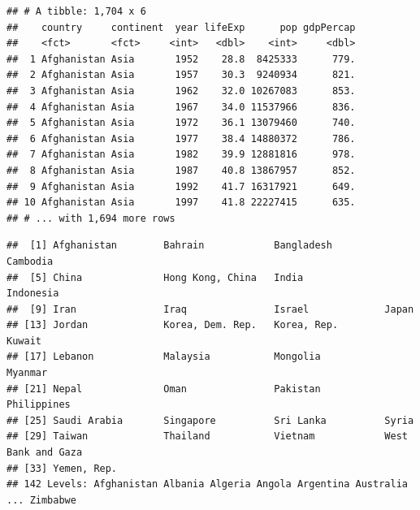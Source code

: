 \documentclass[
]{article}
\newenvironment{Shaded}{\begin{snugshade}}{\end{snugshade}}
\newcommand{\FunctionTok}[1]{\textcolor[rgb]{0.00,0.00,0.00}{#1}}
\newcommand{\NormalTok}[1]{#1}
\newcommand{\SpecialCharTok}[1]{\textcolor[rgb]{0.00,0.00,0.00}{#1}}
\newcommand{\StringTok}[1]{\textcolor[rgb]{0.31,0.60,0.02}{#1}}
\begin{document}
\begin{verbatim}
## # A tibble: 1,704 x 6
##    country     continent  year lifeExp      pop gdpPercap
##    <fct>       <fct>     <int>   <dbl>    <int>     <dbl>
##  1 Afghanistan Asia       1952    28.8  8425333      779.
##  2 Afghanistan Asia       1957    30.3  9240934      821.
##  3 Afghanistan Asia       1962    32.0 10267083      853.
##  4 Afghanistan Asia       1967    34.0 11537966      836.
##  5 Afghanistan Asia       1972    36.1 13079460      740.
##  6 Afghanistan Asia       1977    38.4 14880372      786.
##  7 Afghanistan Asia       1982    39.9 12881816      978.
##  8 Afghanistan Asia       1987    40.8 13867957      852.
##  9 Afghanistan Asia       1992    41.7 16317921      649.
## 10 Afghanistan Asia       1997    41.8 22227415      635.
## # ... with 1,694 more rows
\end{verbatim}

\begin{Shaded}
\end{Shaded}

\begin{verbatim}
##  [1] Afghanistan        Bahrain            Bangladesh         Cambodia          
##  [5] China              Hong Kong, China   India              Indonesia         
##  [9] Iran               Iraq               Israel             Japan             
## [13] Jordan             Korea, Dem. Rep.   Korea, Rep.        Kuwait            
## [17] Lebanon            Malaysia           Mongolia           Myanmar           
## [21] Nepal              Oman               Pakistan           Philippines       
## [25] Saudi Arabia       Singapore          Sri Lanka          Syria             
## [29] Taiwan             Thailand           Vietnam            West Bank and Gaza
## [33] Yemen, Rep.       
## 142 Levels: Afghanistan Albania Algeria Angola Argentina Australia ... Zimbabwe
\end{verbatim}
\end{document}
